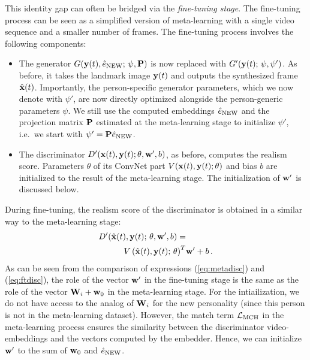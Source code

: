 \documentclass[10pt,twocolumn,letterpaper]{article}
\newcommand{\eq}[1]{(\ref{eq:#1})}
\newcommand{\e}{e}
\begin{document}
This identity gap can often be bridged via the \textit{fine-tuning stage}. The fine-tuning process can be seen as a simplified version of meta-learning with a single video sequence and a smaller number of frames. The fine-tuning process involves the following components:
\begin{itemize}[noitemsep,nolistsep,leftmargin=*]
    \item The generator $G(\y(t),\hat\e\new;\,\psi,\P)$ is now replaced with $G'(\y(t);\,\psi,\psi')$. As before, it takes the landmark image $\y(t)$ and outputs the synthesized frame $\hat\x(t)$. Importantly, the person-specific generator parameters, which we now denote with $\psi'$, are now directly optimized alongside the person-generic parameters $\psi$. We still use the computed embeddings $\hat\e\new$ and the projection matrix $\P$ estimated at the meta-learning stage to initialize $\psi'$, i.e.\ we start with $\psi'=\P\hat\e\new$.
     
     \item The discriminator $D'(\x(t),\y(t);\theta,\w',b)$, as before, computes the realism score. Parameters $\theta$ of its ConvNet part $V(\x(t),\y(t);\theta)$ and bias $b$ are initialized to the result of the meta-learning stage. The initialization of $\w'$ is discussed below.
\end{itemize}
During fine-tuning, the realism score of the discriminator is obtained in a similar way to the meta-learning stage:
\begin{align} \label{eq:ftdisc}
    D'(\hat\x(t),\y(t);\,\theta,\w',b) =&\\ V\left(\hat\x(t),\y(t);\,\theta\right)^T&\w'+b\,.\nonumber
\end{align}
As can be seen from the comparison of expressions \eq{metadisc} and \eq{ftdisc}, the role of the vector $\w'$ in the fine-tuning stage is the same as the role of the vector $\W_i+\w_0$ in the meta-learning stage. For the intiailization, we do not have access to the analog of $\W_i$ for the new personality (since this person is not in the meta-learning dataset). However, the  match term $\mtch{}$ in the meta-learning process ensures the similarity between the discriminator video-embeddings and the vectors computed by the embedder. Hence, we can initialize $\w'$ to the sum of $\w_0$ and $\hat\e\new$.
\end{document}

